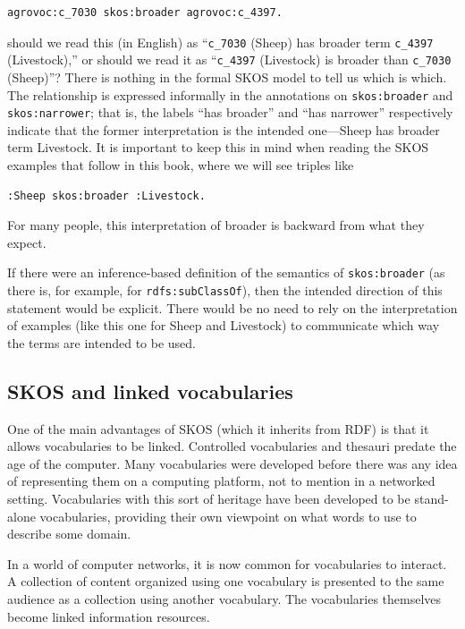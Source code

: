 \begin{lstlisting}
agrovoc:c_7030 skos:broader agrovoc:c_4397.
\end{lstlisting}

should we read this (in English) as ``\texttt{c\_7030} (Sheep) has broader term
\texttt{c\_4397} (Livestock),'' or should we read it as ``\texttt{c\_4397} (Livestock) is
broader than \texttt{c\_7030} (Sheep)''? There is nothing in the formal SKOS
model to tell us which is which. The relationship is expressed
informally in the annotations on \texttt{skos:broader} and \texttt{skos:narrower}; that
is, the labels ``has broader'' and ``has narrower'' respectively
indicate that the former interpretation is the intended one---Sheep has
broader term Livestock. It is important to keep this in mind when
reading the SKOS examples that follow in this book, where we will see
triples like

\begin{lstlisting}
:Sheep skos:broader :Livestock.
\end{lstlisting}

For many people, this interpretation of broader is backward from what
they expect.

If there were an inference-based definition of the semantics of
\texttt{skos:broader} (as there is, for example, for \texttt{rdfs:subClassOf}), then the
intended direction of this statement would be explicit.
There would be no need to rely on the interpretation of examples (like
this one for Sheep and
Livestock) to communicate which way the terms are intended to be used.

\subsection{SKOS and linked vocabularies}

One of the main advantages of SKOS (which it inherits from RDF) is that it allows vocabularies to be
linked. Controlled vocabularies and thesauri predate the age of the
computer. Many vocabularies were developed before there was any idea of
representing them on a computing platform, not to mention in a networked
setting. Vocabularies with this sort of heritage have been developed to
be stand-alone vocabularies, providing their own viewpoint on what words
to use to describe some domain.

In a world of computer networks, it is now common for vocabularies to
interact. A collection of content organized using one vocabulary is
presented to the same audience as a collection using another vocabulary.
The vocabularies themselves become linked information resources.

